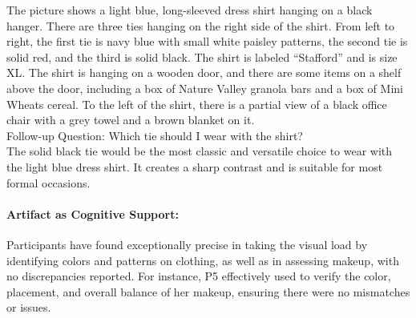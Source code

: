 




\begin{mybox}
The picture shows a light blue, long-sleeved dress shirt hanging on a black hanger. There are three ties hanging on the right side of the shirt. From left to right, the first tie is navy blue with small white paisley patterns, the second tie is solid red, and the third is solid black. The shirt is labeled ``Stafford'' and is size XL. The shirt is hanging on a wooden door, and there are some items on a shelf above the door, including a box of Nature Valley granola bars and a box of Mini Wheats cereal. To the left of the shirt, there is a partial view of a black office chair with a grey towel and a brown blanket on it.\\
Follow-up Question: Which tie should I wear with the shirt?\\
The solid black tie would be the most classic and versatile choice to wear with the light blue dress shirt. It creates a sharp contrast and is suitable for most formal occasions.
\end{mybox}



\paragraph{Artifact as Cognitive Support:}

Participants have found \bma{} exceptionally precise in taking the visual load by identifying colors and patterns on clothing, as well as in assessing makeup, with no discrepancies reported. For instance, P5 effectively used \bma{} to verify the color, placement, and overall balance of her makeup, ensuring there were no mismatches or issues. 



